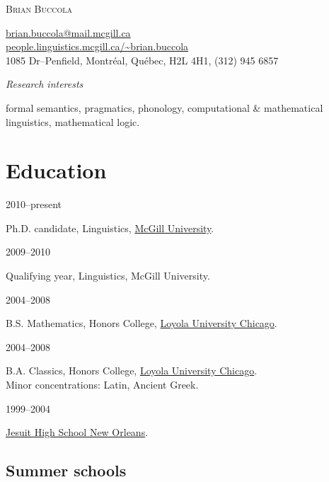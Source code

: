 \documentclass[11pt,letterpaper]{article}
\newcommand{\name}{Brian Buccola}
\newcommand{\cvitem}[2]{%
  \begin{minipage}[t]{0.24\textwidth}
    #1 %
  \end{minipage}
  \hfill
  \begin{minipage}[t]{0.74\textwidth}
    #2 %
  \end{minipage}
}
\begin{document}

\begin{minipage}[b]{0.43\textwidth}
  {\Huge\scshape \name}
\end{minipage}
\hfill
\begin{minipage}[b]{0.55\textwidth}
  \begin{flushright}
    \href{mailto:brian.buccola@mail.mcgill.ca}{\ttfamily\small
      brian.buccola@mail.mcgill.ca}                               \\
    \href{http://people.linguistics.mcgill.ca/}{\ttfamily\small
    people.linguistics.mcgill.ca/\textasciitilde{}brian.buccola}  \\
    {\footnotesize 1085 Dr--Penfield, Montr\'{e}al, Qu\'{e}bec, H2L 4H1, (312)
    945 6857}
  \end{flushright}
\end{minipage}

\vspace{-1.25em}

\hrulefill

\cvitem{\textit{Research interests}}{formal semantics, pragmatics, phonology,
computational \& mathematical linguistics, mathematical logic.}






\section*{Education}

\cvitem{2010--present}{Ph.D. candidate, Linguistics,
  \href{http://www.mcgill.ca/}{McGill University}.}

\cvitem{2009--2010}{Qualifying year, Linguistics, McGill University.}

\cvitem{2004--2008}{B.S. Mathematics, Honors College,
  \href{http://www.luc.edu/}{Loyola University Chicago}.}

\cvitem{2004--2008}{B.A. Classics, Honors College,
  \href{http://www.luc.edu/}{Loyola University Chicago}. \\ {\footnotesize Minor
  concentrations: Latin, Ancient Greek.}}

\cvitem{1999--2004}{\href{http://www.jesuitnola.org/}{Jesuit High School New
Orleans}.}

\subsection*{Summer schools}
\end{document}
